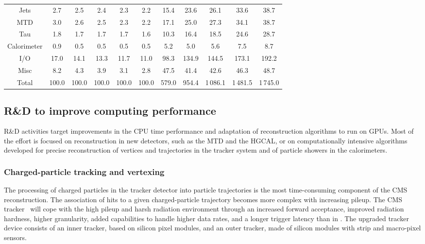 \begin{table}[tbhp]
\begin{tabular}{|c|c|c|c|c|c|c|c|c|c|c|}
    Jets                   &   2.7   & 2.5   & 2.4   & 2.3   &  2.2  & 15.4  &  23.6  & 26.1     & 33.6     & 38.7     \\ \cellcolor{tablerowheader}
    \gls{MTD}              &   3.0   & 2.6   & 2.5   & 2.3   &  2.2  & 17.1  &  25.0  & 27.3     & 34.1     & 38.7     \\ \cellcolor{tablerowheader}
    Tau                    &   1.8   & 1.7   & 1.7   & 1.7   &  1.6  & 10.3  &  16.4  & 18.5     & 24.6     & 28.7     \\ \cellcolor{tablerowheader}
    Calorimeter            &   0.9   & 0.5   & 0.5   & 0.5   &  0.5  & 5.2   &  5.0   & 5.6      & 7.5      & 8.7      \\ \cellcolor{tablerowheader}
    I/O                    &   17.0  & 14.1  & 13.3  & 11.7  & 11.0  & 98.3  & 134.9  & 144.5    & 173.1    & 192.2    \\ \cellcolor{tablerowheader}
    Misc                   &   8.2   & 4.3   & 3.9   & 3.1   &  2.8  & 47.5  &  41.4  & 42.6     & 46.3     & 48.7     \\ \cellcolor{tablerowheader}
    Total                  &   100.0 & 100.0 & 100.0 & 100.0 & 100.0 & 579.0 & 954.4  & 1\,086.1 & 1\,481.5 & 1\,745.0 \\ \hline
    \end{tabular}           
    \label{tab:recoTiming}
\end{table}

\subsection{R\&D to improve computing performance}

R\&D activities target improvements in the \gls{CPU} time performance and adaptation of reconstruction algorithms to run on \glspl{GPU}. Most of the effort is focused on reconstruction in new detectors, such as the \gls{MTD} and the \gls{HGCAL}, or on computationally intensive algorithms developed for precise reconstruction of vertices and trajectories in the tracker system and of particle showers in the calorimeters.

\subsubsection{Charged-particle tracking and vertexing}

The processing of charged particles in the tracker detector into particle trajectories is the most time-consuming component of the CMS reconstruction.  The association of hits to a given charged-particle trajectory becomes more complex with increasing pileup.  
The \PhaseTwo CMS tracker~\cite{CMS:2017TrackTDR} will cope with the high pileup and harsh radiation environment through an increased forward acceptance, improved radiation hardness, higher granularity, added capabilities to handle higher data rates, and a longer trigger latency than in \PhaseOne. The upgraded tracker device consists of an inner tracker, based on silicon pixel modules, and an outer tracker, made of silicon modules with strip and macro-pixel sensors.   

